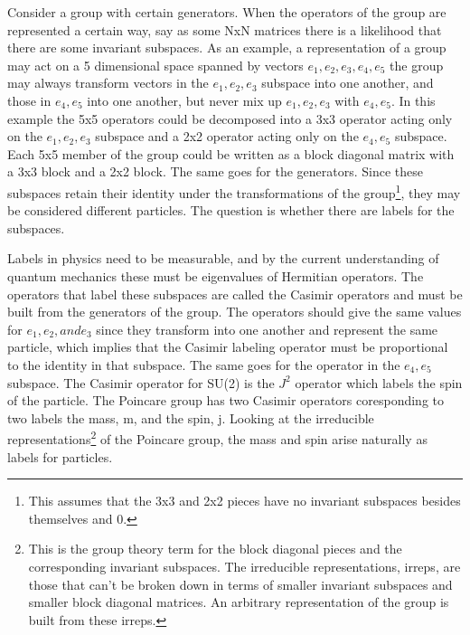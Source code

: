 Consider a group with certain generators. When the operators of the group are represented a certain way, say as some NxN matrices there is a likelihood that there are some invariant subspaces. As an example, a representation of a group may act on a 5 dimensional space spanned by vectors $e_1, e_2, e_3, e_4, e_5$ the group may always transform vectors in the $e_1, e_2, e_3$ subspace into one another, and those in $e_4, e_5$ into one another, but never mix up $e_1, e_2, e_3$ with $e_4, e_5$. In this example the 5x5 operators could be decomposed into a 3x3 operator acting only on the $e_1, e_2, e_3$ subspace and a 2x2 operator acting only on the $e_4, e_5$ subspace. Each 5x5 member of the group could be written as a block diagonal matrix with a 3x3 block and a 2x2 block. The same goes for the generators. Since these subspaces retain their identity under the transformations of the group\footnote{This assumes that the 3x3 and 2x2 pieces have no invariant subspaces besides themselves and 0.}, they may be considered different particles. The question is whether there are labels for the subspaces.  

Labels in physics need to be measurable, and by the current understanding of quantum mechanics these must be eigenvalues of Hermitian operators. The operators that label these subspaces are called the Casimir operators and must be built from the generators of the group. The operators should give the same values for $e_1, e_2, and e_3$ since they transform into one another and represent the same particle, which implies that the Casimir labeling operator must be proportional to the identity in that subspace. The same goes for the operator in the $e_4, e_5$ subspace. The Casimir operator for SU(2) is the $J^2$ operator which labels the spin of the particle. The Poincare group has two Casimir operators coresponding to two labels the mass, m, and the spin, j. Looking at the irreducible representations\footnote{This is the group theory term for the block diagonal pieces and the corresponding invariant subspaces. The irreducible representations, irreps, are those that can't be broken down in terms of smaller invariant subspaces and smaller block diagonal matrices. An arbitrary representation of the group is built from these irreps.} of the Poincare group, the mass and spin arise naturally as labels for particles. 



